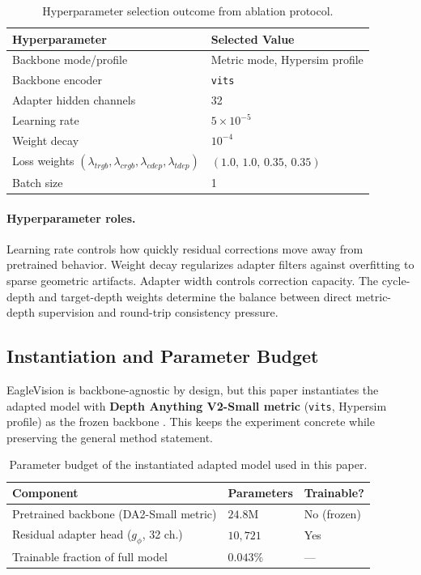 \documentclass{article}
\begin{document}
\begin{table}[t]
\caption{Hyperparameter selection outcome from ablation protocol.}
\label{tab:hparam_select}
\centering
\small
\begin{tabular}{L{0.33\columnwidth}L{0.55\columnwidth}}
\toprule
Hyperparameter & Selected Value \\
\midrule
Backbone mode/profile & Metric mode, Hypersim profile \\
Backbone encoder & \texttt{vits} \\
Adapter hidden channels & 32 \\
Learning rate & $5\times 10^{-5}$ \\
Weight decay & $10^{-4}$ \\
Loss weights $(\lambda_{trgb},\lambda_{crgb},\lambda_{cdep},\lambda_{tdep})$ & $(1.0,\,1.0,\,0.35,\,0.35)$ \\
Batch size & 1 \\
\bottomrule
\end{tabular}
\end{table}

\paragraph{Hyperparameter roles.}
Learning rate controls how quickly residual corrections move away from pretrained behavior. Weight decay regularizes adapter filters against overfitting to sparse geometric artifacts. Adapter width controls correction capacity. The cycle-depth and target-depth weights determine the balance between direct metric-depth supervision and round-trip consistency pressure.

\subsection{Instantiation and Parameter Budget}
EagleVision is backbone-agnostic by design, but this paper instantiates the adapted model with \textbf{Depth Anything V2-Small metric} (\texttt{vits}, Hypersim profile) as the frozen backbone \cite{yang2024depthanythingv2}. This keeps the experiment concrete while preserving the general method statement.

\begin{table}[t]
\caption{Parameter budget of the instantiated adapted model used in this paper.}
\label{tab:param_budget}
\centering
\small
\begin{tabular}{L{0.36\columnwidth}L{0.24\columnwidth}L{0.28\columnwidth}}
\toprule
Component & Parameters & Trainable? \\
\midrule
Pretrained backbone (DA2-Small metric) & $24.8$M & No (frozen) \\
Residual adapter head ($g_{\phi}$, 32 ch.) & $10{,}721$ & Yes \\
\midrule
Trainable fraction of full model & $0.043\%$ & --- \\
\bottomrule
\end{tabular}
\end{table}
\end{document}
